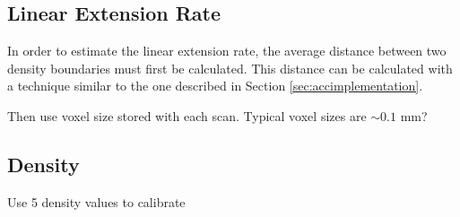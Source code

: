 
\subsection{Linear Extension Rate}

In order to estimate the linear extension rate, the average distance between two density boundaries must first be calculated. This distance can be calculated with a technique similar to the one described in Section \ref{sec:accimplementation}.

Then use voxel size stored with each scan. Typical voxel sizes are ${\sim}0.1$ mm?

\subsection{Density}

Use 5 density values to calibrate 